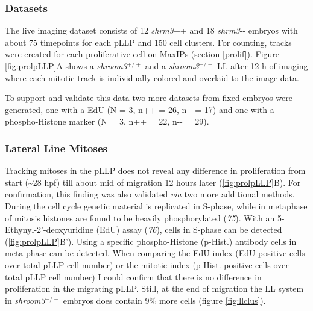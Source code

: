 \documentclass[11pt,singlespacinge,twoside]{reedthesis} %
\theoremstyle{definition}
\theoremstyle{definition}
\theoremstyle{definition}
\theoremstyle{remark}
\begin{document}
\hypertarget{datasets}{%
\subsubsection{Datasets}\label{datasets}}

The live imaging dataset consists of 12 \emph{shrm3}++ and 18 \emph{shrm3}-\/- embryos with about 75 timepoints for each pLLP and 150 cell clusters. For counting, tracks were created for each proliferative cell on MaxIPs (section \ref{prolif}). Figure \ref{fig:prolpLLP}A shows a \emph{shroom3}\(^{+/+}\) and a \emph{shroom3}\(^{-/-}\) LL after 12 h of imaging where each mitotic track is individually colored and overlaid to the image data.

To support and validate this data two more datasets from fixed embryos were generated, one with a EdU (N = 3, n++ = 26, n-\/- = 17) and one with a phospho-Histone marker (N = 3, n++ = 22, n-\/- = 29).

\hypertarget{res-prolpLLP}{%
\subsubsection{Lateral Line Mitoses}\label{res-prolpLLP}}

Tracking mitoses in the pLLP does not reveal any difference in proliferation from start (\textasciitilde28 hpf) till about mid of migration 12 hours later (\ref{fig:prolpLLP}B). For confirmation, this finding was also validated \emph{via} two more additional methods. During the cell cycle genetic material is replicated in S-phase, while in metaphase of mitosis histones are found to be heavily phosphorylated (\emph{75}). With an 5-Ethynyl-2'-deoxyuridine (EdU) assay (\emph{76}), cells in S-phase can be detected (\ref{fig:prolpLLP}B'). Using a specific phospho-Histone (p-Hist.) antibody cells in meta-phase can be detected. When comparing the
EdU index (EdU positive cells over total pLLP cell number) or the mitotic index (p-Hist. positive cells over total pLLP cell number) I could confirm that there is no difference in proliferation in the migrating pLLP. Still, at the end of migration the LL system in \emph{shroom3}\(^{-/-}\) embryos does contain 9\(\%\) more cells (figure \ref{fig:llclus}).
\end{document}

